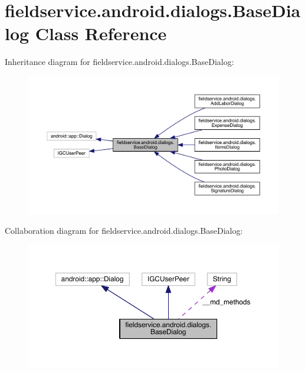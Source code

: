 \hypertarget{classfieldservice_1_1android_1_1dialogs_1_1_base_dialog}{\section{fieldservice.\+android.\+dialogs.\+Base\+Dialog Class Reference}
\label{classfieldservice_1_1android_1_1dialogs_1_1_base_dialog}
}


Inheritance diagram for fieldservice.\+android.\+dialogs.\+Base\+Dialog\+:
\nopagebreak
\begin{figure}[H]
\begin{center}
\leavevmode
\includegraphics[width=350pt]{classfieldservice_1_1android_1_1dialogs_1_1_base_dialog__inherit__graph}
\end{center}
\end{figure}


Collaboration diagram for fieldservice.\+android.\+dialogs.\+Base\+Dialog\+:
\nopagebreak
\begin{figure}[H]
\begin{center}
\leavevmode
\includegraphics[width=350pt]{classfieldservice_1_1android_1_1dialogs_1_1_base_dialog__coll__graph}
\end{center}
\end{figure}
